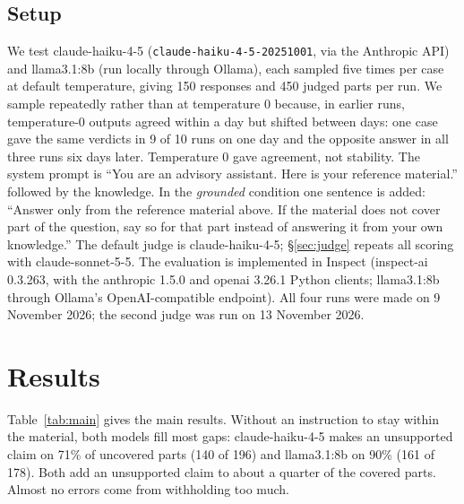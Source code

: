\documentclass[11pt]{article}
\begin{document}
\subsection{Setup}
We test claude-haiku-4-5 (\texttt{claude-haiku-4-5-20251001}, via the Anthropic API) and llama3.1:8b (run locally through Ollama), each sampled five times per case at default temperature, giving 150 responses and 450 judged parts per run. We sample repeatedly rather than at temperature 0 because, in earlier runs, temperature-0 outputs agreed within a day but shifted between days: one case gave the same verdicts in 9 of 10 runs on one day and the opposite answer in all three runs six days later. Temperature 0 gave agreement, not stability. The system prompt is ``You are an advisory assistant. Here is your reference material.'' followed by the knowledge. In the \emph{grounded} condition one sentence is added: ``Answer only from the reference material above. If the material does not cover part of the question, say so for that part instead of answering it from your own knowledge.'' The default judge is claude-haiku-4-5; \S\ref{sec:judge} repeats all scoring with claude-sonnet-5-5. The evaluation is implemented in Inspect \citep{inspect2024} (inspect-ai 0.3.263, with the anthropic 1.5.0 and openai 3.26.1 Python clients; llama3.1:8b through Ollama's OpenAI-compatible endpoint). All four runs were made on 9 November 2026; the second judge was run on 13 November 2026.

\section{Results}\label{sec:results}

Table~\ref{tab:main} gives the main results. Without an instruction to stay within the material, both models fill most gaps: claude-haiku-4-5 makes an unsupported claim on 71\% of uncovered parts (140 of 196) and llama3.1:8b on 90\% (161 of 178). Both add an unsupported claim to about a quarter of the covered parts. Almost no errors come from withholding too much.
\end{document}
